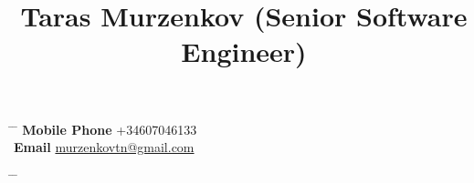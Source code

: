 \documentclass[10pt]{article} %
\begin{document}


\title{Taras Murzenkov (Senior Software Engineer) } %


\parbox{0.2\textwidth}{ %
\begin{tabbing} %
\hspace{3cm} \= \hspace{4cm} \= \kill %
{\bf Mobile Phone} \>+34607046133\\ 
{\bf Email} \> \href{mailto:murzenkovtn@gmail.com}{murzenkovtn@gmail.com} %

\end{tabbing}}
\hfill %
\parbox{0.5\textwidth}{ %
\begin{tabbing} %
\hspace{3cm} \= \hspace{4cm} \= \kill %
\\ %
\end{tabbing}}

\end{document}
